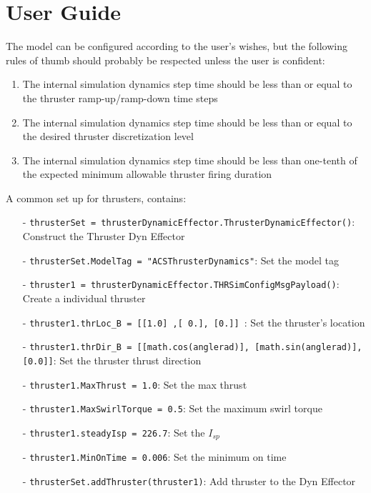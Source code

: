 \section{User Guide}

The model can be configured according to the user's wishes, but the following 
rules of thumb should probably be respected unless the user is confident:
\begin{enumerate}
\item{The internal simulation dynamics step time should be less than or equal 
     to the thruster ramp-up/ramp-down time steps}
\item{The internal simulation dynamics step time should be less than or equal to 
     the desired thruster discretization level}
\item{The internal simulation dynamics step time should be less than one-tenth 
    of the expected minimum allowable thruster firing duration}
\end{enumerate}

A common set up for thrusters, contains:

\begin{itemize}
  \item[-]      \texttt{thrusterSet = thrusterDynamicEffector.ThrusterDynamicEffector()}: Construct the Thruster Dyn Effector
  \item[-]   \texttt{thrusterSet.ModelTag = "ACSThrusterDynamics"}: Set the model tag
  \item[-]   \texttt{thruster1 = thrusterDynamicEffector.THRSimConfigMsgPayload()}: Create a individual thruster
  \item[-]   \texttt{thruster1.thrLoc\_B = [[1.0] ,[ 0.], [0.]] }: Set the thruster's location
  \item[-]   \texttt{thruster1.thrDir\_B = [[math.cos(anglerad)], [math.sin(anglerad)], [0.0]]}: Set the thruster thrust direction
  \item[-]   \texttt{thruster1.MaxThrust = 1.0}: Set the max thrust
  \item[-]   \texttt{thruster1.MaxSwirlTorque = 0.5}: Set the maximum swirl torque
  \item[-]   \texttt{thruster1.steadyIsp = 226.7}: Set the $I_{sp}$
  \item[-]   \texttt{thruster1.MinOnTime = 0.006}: Set the minimum on time
  \item[-]   \texttt{thrusterSet.addThruster(thruster1)}: Add thruster to the Dyn Effector
\end{itemize}

